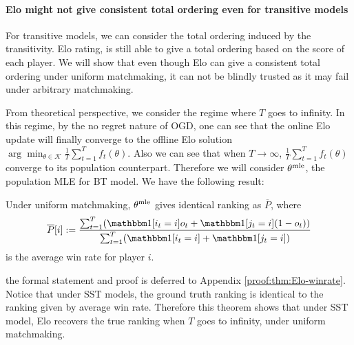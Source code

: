 





\paragraph{Elo might not give consistent total ordering even for transitive models}

For transitive models, we can consider the total ordering induced by the transitivity. Elo rating, is still able to give a total ordering based on the score of each player. We will show that even though Elo can give a consistent total ordering under uniform matchmaking, it can not be blindly trusted as it may fail under arbitrary matchmaking.


From theoretical perspective, we consider the regime where $T$ goes to infinity. In this regime, by the no regret nature of OGD, one can see that the online Elo update will finally converge to the offline Elo solution $ \arg \min_{\theta \in \mathcal{K}} \frac1T \sum_{t=1}^{T} f_t(\theta) $. Also we can see that when $T \to \infty$, $\frac1T \sum_{t=1}^{T} f_t(\theta)$ converge to its population counterpart. Therefore we will consider $\theta^{\rm mle}$, the population MLE for BT model. We have the following result: 
\begin{theorem} \label{thm:Elo-winrate}
Under uniform matchmaking, $\theta^{\rm mle}$ gives identical ranking as $\overline{P}$, where 
$$\overline{P}[i] := \frac{\sum_{t=1}^T (\one[i_t = i]o_t + \one[j_t=i](1-o_t))}{\sum_{t=1}^T (\one[i_t = i]+\one [j_t=i])}$$ is the average win rate for player $i$.
\end{theorem}
the formal statement and proof is deferred to Appendix \ref{proof:thm:Elo-winrate}. Notice that under SST models, the ground truth ranking is identical to the ranking given by average win rate. Therefore this theorem shows that under SST model, Elo recovers the true ranking when $T$ goes to infinity, under uniform matchmaking. 

